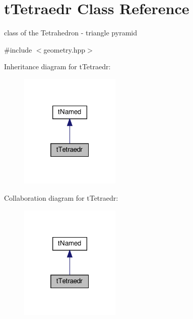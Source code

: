 \hypertarget{classtTetraedr}{}\section{t\+Tetraedr Class Reference}
\label{classtTetraedr}


class of the Tetrahedron -\/ triangle pyramid  




{\ttfamily \#include $<$geometry.\+hpp$>$}



Inheritance diagram for t\+Tetraedr\+:
\nopagebreak
\begin{figure}[H]
\begin{center}
\leavevmode
\includegraphics[width=136pt]{classtTetraedr__inherit__graph}
\end{center}
\end{figure}


Collaboration diagram for t\+Tetraedr\+:
\nopagebreak
\begin{figure}[H]
\begin{center}
\leavevmode
\includegraphics[width=136pt]{classtTetraedr__coll__graph}
\end{center}
\end{figure}
